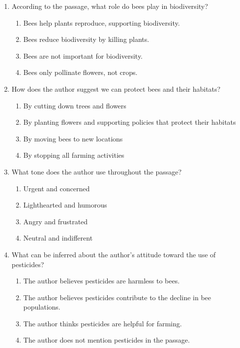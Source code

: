 \documentclass[12pt]{article}
\begin{document}
\begin{enumerate}
    \item According to the passage, what role do bees play in biodiversity?
    \begin{enumerate}[label=\Alph*.]
        \item Bees help plants reproduce, supporting biodiversity.
        \item Bees reduce biodiversity by killing plants.
        \item Bees are not important for biodiversity.
        \item Bees only pollinate flowers, not crops.
    \end{enumerate}

    \vspace{0.5cm}

    \item How does the author suggest we can protect bees and their habitats?
    \begin{enumerate}[label=\Alph*.]
        \item By cutting down trees and flowers
        \item By planting flowers and supporting policies that protect their habitats
        \item By moving bees to new locations
        \item By stopping all farming activities
    \end{enumerate}

    \vspace{0.5cm}

    \item What tone does the author use throughout the passage?
    \begin{enumerate}[label=\Alph*.]
        \item Urgent and concerned
        \item Lighthearted and humorous
        \item Angry and frustrated
        \item Neutral and indifferent
    \end{enumerate}

    \vspace{0.5cm}

    \item What can be inferred about the author's attitude toward the use of pesticides?
    \begin{enumerate}[label=\Alph*.]
        \item The author believes pesticides are harmless to bees.
        \item The author believes pesticides contribute to the decline in bee populations.
        \item The author thinks pesticides are helpful for farming.
        \item The author does not mention pesticides in the passage.
    \end{enumerate}

\end{enumerate}
\end{document}

